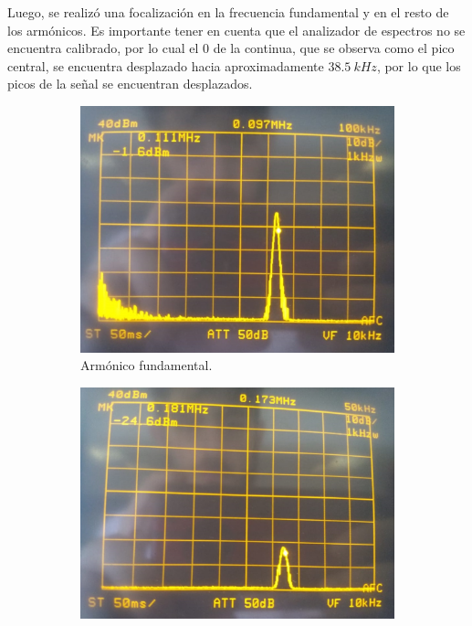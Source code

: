 Luego, se realizó una focalización en la frecuencia fundamental y en el resto de los armónicos. Es importante tener en cuenta que el analizador de espectros no se encuentra calibrado, por lo cual el 0 de la continua, que se observa como el pico central, se encuentra desplazado hacia aproximadamente $38.5 \ kHz$, por lo que los picos de la señal se encuentran desplazados.
\begin{figure}[H]
\centering
\begin{subfigure}{.4\textwidth}
\centering
	\includegraphics[width=\textwidth]{Imagenes-Ej1/Fundamental.jpeg}
	\caption{Armónico fundamental.}
	\label{fig:Fund}
\end{subfigure}
\begin{subfigure}{.425\textwidth}
\centering
	\includegraphics[width=\textwidth]{Imagenes-Ej1/1Armonico.jpeg}

\end{subfigure}
\end{figure}
